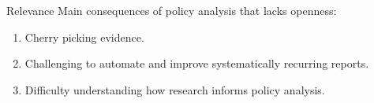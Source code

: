 \documentclass{beamer}
\def\white{\color{white}}
\begin{document}

\begin{frame}{Relevance}
Main consequences of policy analysis that lacks openness:
\begin{enumerate}
\item Cherry picking evidence.
\item Challenging to automate and improve systematically recurring reports.
\item Difficulty understanding how research informs policy analysis.
\end{enumerate}
\end{frame}
\end{document}
